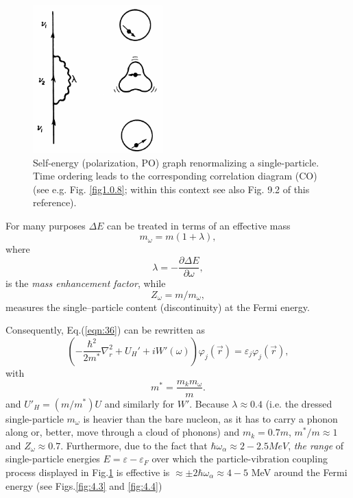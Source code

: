 \begin{figure}[h!]
\centerline {
\includegraphics*[width=5cm]{introduccion/figs/figintroD2}
}
\caption{Self-energy (polarization, PO) graph renormalizing  a single-particle. Time ordering leads to the corresponding correlation diagram (CO) (see e.g. Fig. \ref{fig1.0.8}; within this context see also \cite{Brink:05} Fig. 9.2 of this reference).}
\label{fig:4.2}
\end{figure}
For many purposes $\Delta E$ can be treated in terms of an effective mass
\begin{equation}
m_{\omega} = m(1+\lambda),
\label{eqn:38}
\end{equation}
where
\begin{equation}
\lambda= - \frac{\partial \Delta E}{\partial \omega},
\label{eqn:39}
\end{equation}
is the {\it mass enhancement factor}, while
\begin{equation}
\nonumber
Z_{\omega}=m/m_{\omega},
\end{equation}
measures the single--particle content (discontinuity) at the Fermi energy.

Consequently, Eq.(\ref{eqn:36}) can be rewritten as
\begin{equation}
\left( - \frac{\hbar^2}{2m^*} \nabla_r^2 + U_H' + i W'(\omega) \right) \varphi_j(\vec{r}) = \varepsilon_j \varphi_j(\vec{r}),
\label{eqn:40a}
\end{equation}
with
\begin{equation}
m^* = \frac{m_k m_{\omega}}{m} .
\label{eqn:40b}
\end{equation}
 and $U'_H = (m/m^*) U$ and similarly for $W'$. Because $\lambda \approx 0.4$ (i.e. the dressed single-particle $m_{\omega}$ is heavier than the bare nucleon, as it has to carry a phonon along or, better, move through a cloud of phonons) and $m_k=0.7m$, $m^*/m \approx 1$ and $Z_{\omega} \approx 0.7$. Furthermore, due to the fact that $\hbar \omega_{\alpha} \approx 2-2.5 MeV$, {\it the range} of single-particle energies $E=\varepsilon-\varepsilon_F$ over which the particle-vibration coupling process displayed in Fig.\ref{fig:4.2} is effective is $\approx \pm 2\hbar \omega_{\alpha} \approx 4-5$ MeV around the Fermi energy (see Figs.\ref{fig:4.3} and \ref{fig:4.4})

